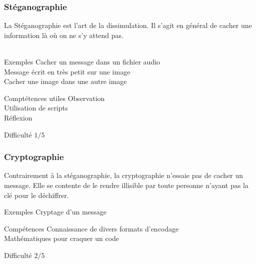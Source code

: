 \documentclass{beamer}
\begin{document}

\begin{frame}
\frametitle{Stéganographie}

La Stéganographie est l’art de la dissimulation. Il s’agit en général de cacher une information là où on ne s’y attend pas. \\~\\

\begin{block}{Exemples}
    Cacher un message dans un fichier audio \\
    Message écrit en très petit sur une image \\
    Cacher une image dans une autre image
\end{block}

\begin{block}{Comptétences utiles}
    Observation \\
    Utilisation de scripts \\
    Réflexion
\end{block}

\begin{block}{Difficulté}
    $1/5$
\end{block}

\end{frame}


\begin{frame}
\frametitle{Cryptographie}

Contrairement à la stéganographie, la cryptographie n'essaie pas de cacher un message. Elle se contente de le rendre illisible par toute personne n'ayant pas la clé pour le déchiffrer.

\begin{block}{Exemples}
    Cryptage d'un message 
\end{block}

\begin{block}{Compétences}
    Connaissance de divers formats d'encodage \\
    Mathématiques pour craquer un code
\end{block}

\begin{block}{Difficulté}
    $2/5$
\end{block}

\end{frame}

\end{document}
